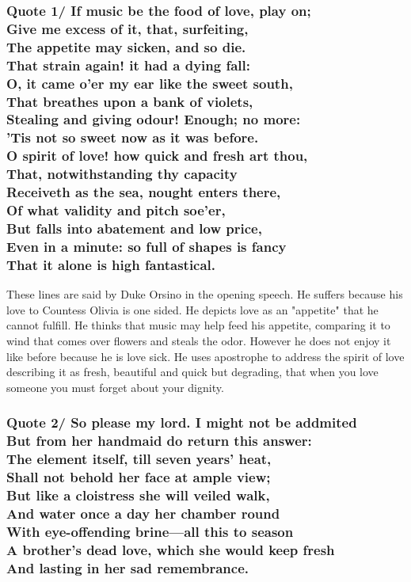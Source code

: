 \documentclass[12pt, a4paper]{article}
\begin{document}
\subsubsection*{Quote 1/
  If music be the food of love, play on;\\
	Give me excess of it, that, surfeiting,\\
	The appetite may sicken, and so die.\\
	That strain again! it had a dying fall:\\
	O, it came o'er my ear like the sweet south,\\
	That breathes upon a bank of violets,\\
	Stealing and giving odour! Enough; no more:\\
	'Tis not so sweet now as it was before.\\
	O spirit of love! how quick and fresh art thou,\\
	That, notwithstanding thy capacity	\\
	Receiveth as the sea, nought enters there,\\
	Of what validity and pitch soe'er,\\
	But falls into abatement and low price,\\
	Even in a minute: so full of shapes is fancy\\
	That it alone is high fantastical.
}
These lines are said by Duke Orsino  in the opening speech. He suffers because
his love to Countess Olivia is one sided. He depicts love as an "appetite" that
he cannot fulfill. He thinks that music may help feed his appetite, comparing
it to wind that comes over flowers and steals the odor. However he does not
enjoy it like before because he is love sick. He uses apostrophe to address the spirit of love
describing it as fresh, beautiful and quick but degrading, that when you
love someone you must forget about your dignity.

\subsubsection*{Quote 2/ 
  So please my lord. I might not be addmited\\ 
  But from her handmaid do return this answer:\\
  The element itself, till seven years' heat, \\
  Shall not behold her face at ample view;\\ 
  But like a cloistress she will veiled walk,\\ 
  And water once a day her chamber round \\ 
  With eye-offending brine---all this to season\\
  A brother's dead love, which she would keep fresh\\
  And lasting in her sad remembrance.
}
\end{document}
